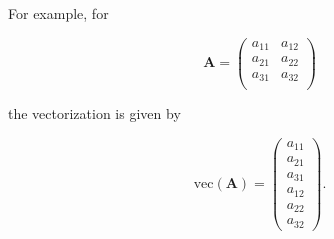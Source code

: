 For example, for

\begin{equation}
    \mathbf{A}
    =
    \left(
    \begin{array}{cc}
         a_{11} &  a_{12} \\
         a_{21} &  a_{22} \\
         a_{31} &  a_{32} \\
    \end{array}
    \right)
\end{equation}

\noindent the vectorization is given by

\begin{equation}
    \mathrm{vec}
    \left(
    \mathbf{A}
    \right)
    =
    \left(
    \begin{array}{c}
         a_{11} \\
         a_{21} \\ 
         a_{31} \\ 
         a_{12} \\
         a_{22} \\
         a_{32}
    \end{array}
    \right).
\end{equation}
